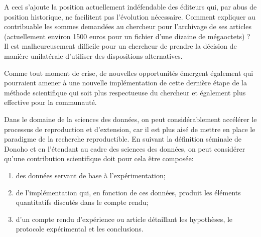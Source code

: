 A ceci s'ajoute la position actuellement indéfendable des éditeurs qui, par abus de position historique, ne facilitent pas l'évolution nécessaire. Comment expliquer au contribuable les sommes demandées au chercheur pour l'archivage de ses articles (actuellement environ 1500 euros pour un fichier d'une dizaine de mégaoctets) ? Il est malheureusement difficile pour un chercheur de prendre la décision de manière unilatérale d'utiliser des dispositions alternatives.

Comme tout moment de crise, de nouvelles opportunités émergent également qui pourraient amener à une nouvelle implémentation de cette dernière étape de la méthode scientifique qui soit plus respectueuse du chercheur et également plus effective pour la communauté. %


Dans le domaine de la sciences des données, on peut considérablement accélérer le processus de reproduction et d'extension, car il est plus aisé de mettre en place le paradigme de la recherche reproductible. En suivant la définition séminale de Donoho et en l'étendant au cadre des sciences des données, on peut considérer qu'une contribution scientifique doit pour cela être composée:
\begin{enumerate}
  \item des données servant de base à l'expérimentation;
  \item de l'implémentation qui, en fonction de ces données, produit les éléments quantitatifs discutés dans le compte rendu;
  \item d'un compte rendu d'expérience ou article détaillant les hypothèses, le protocole expérimental et les conclusions.
\end{enumerate}

